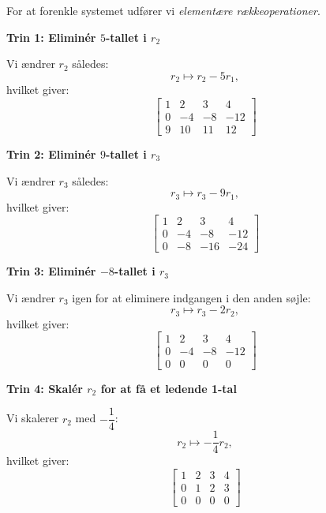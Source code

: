 \begin{solution} For at forenkle systemet udfører vi \textit{elementære rækkeoperationer}.
        
    \textbf{Trin 1: Eliminér \( 5 \)-tallet i \( r_2 \)}
        
        Vi ændrer \( r_2 \) således:
        \[
        r_2 \mapsto r_2 - 5r_1,
        \]
        hvilket giver:
        \[
        \left[\begin{array}{cccc}
        1 & 2 & 3 & 4 \\
        0 & -4 & -8 & -12 \\
        9 & 10 & 11 & 12
        \end{array}\right]
        \]
        
    \textbf{Trin 2: Eliminér \( 9 \)-tallet i \( r_3 \)}
        
        Vi ændrer \( r_3 \) således:
        \[
        r_3 \mapsto r_3 - 9r_1,
        \]
        hvilket giver:
        \[
        \left[\begin{array}{ccc|c}
        1 & 2 & 3 & 4 \\
        0 & -4 & -8 & -12 \\
        0 & -8 & -16 & -24
        \end{array}\right]
        \]
        
    \textbf{Trin 3: Eliminér \( -8 \)-tallet i \( r_3 \)}
        
        Vi ændrer \( r_3 \) igen for at eliminere indgangen i den anden søjle:
        \[
        r_3 \mapsto r_3 - 2r_2,
        \]
        hvilket giver:
        \[
        \left[\begin{array}{cccc}
        1 & 2 & 3 & 4 \\
        0 & -4 & -8 & -12 \\
        0 & 0 & 0 & 0
        \end{array}\right]
        \]
        
    \newpage

    \textbf{Trin 4: Skalér \( r_2 \) for at få et ledende 1-tal}
        
        Vi skalerer \( r_2 \) med \( -\dfrac{1}{4} \):
        \[
        r_2 \mapsto -\dfrac{1}{4} r_2,
        \]
        hvilket giver:
        \[
        \left[\begin{array}{ccc|c}
        1 & 2 & 3 & 4 \\
        0 & 1 & 2 & 3 \\
        0 & 0 & 0 & 0
        \end{array}\right]
        \]
        

\end{solution}
